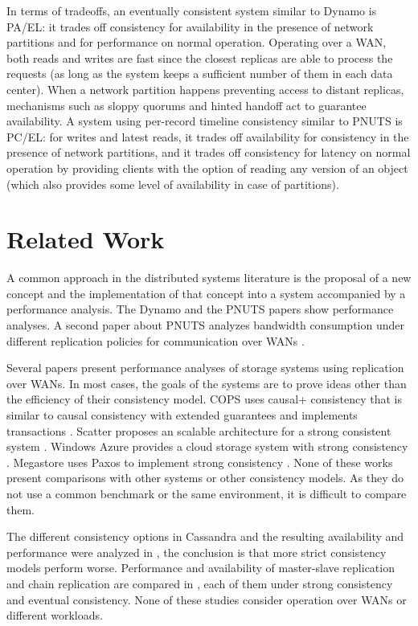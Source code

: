 \documentclass[doublespacing]{bmcart}
\begin{document}
In terms of tradeoffs, an eventually consistent system similar to
Dynamo is PA/EL: it trades off consistency for availability in the presence of
network partitions and for performance on normal operation. Operating over a
WAN, both reads and writes are fast since the closest replicas are able to
process the requests (as long as the system keeps a sufficient number of them
in each data center). When a network partition happens preventing access to
distant replicas, mechanisms such as sloppy quorums and hinted handoff act to
guarantee availability. A system using per-record timeline consistency similar
to PNUTS is PC/EL: for writes and latest reads, it trades off availability for
consistency in the presence of network partitions, and it trades off
consistency for latency on normal operation by providing clients with the
option of reading any version of an object (which also provides some level of
availability in case of partitions).

\section{Related Work}

A common approach in the distributed systems literature is the proposal of a
new concept and the implementation of that concept into a system accompanied by
a performance analysis. The Dynamo \cite{DeCandia2007} and the PNUTS papers
\cite{Cooper2008} show performance analyses. A second paper about PNUTS
analyzes bandwidth consumption under different replication policies for
communication over WANs \cite{Kadambi2011}.

Several papers present performance analyses of storage systems using
replication over WANs. In most cases, the goals of the systems are to prove
ideas other than the efficiency of their consistency model. COPS uses causal+
consistency that is similar to causal consistency with extended guarantees and
implements transactions \cite{Lloyd2011}. Scatter proposes an scalable
architecture for a strong consistent system \cite{Glendenning2011}. Windows
Azure provides a cloud storage system with strong consistency
\cite{Calder2011}. Megastore uses Paxos to implement strong consistency
\cite{Baker2011}. None of these works present comparisons with other systems or
other consistency models. As they do not use a common benchmark or the same
environment, it is difficult to compare them.

The different consistency options in Cassandra and the resulting availability
and performance were analyzed in \cite{Beyer2011}, the conclusion is that
more strict consistency models perform worse. Performance and availability of
master-slave replication and chain replication are compared in
\cite{vanRenesse2004}, each of them under strong consistency and eventual
consistency. None of these studies consider operation over WANs or different
workloads.
\end{document}

